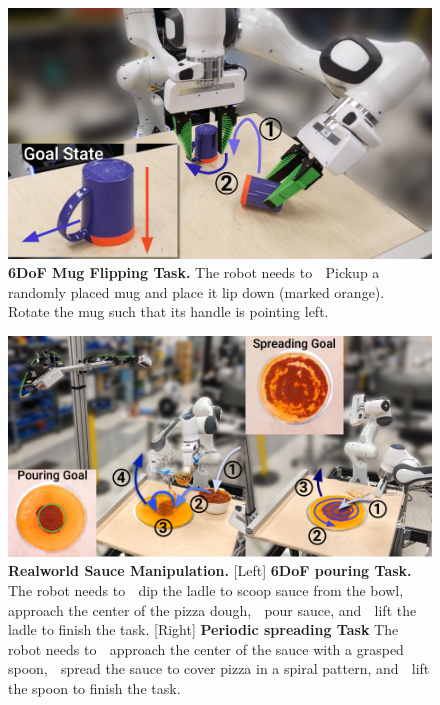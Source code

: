 \begin{figure}[t]
\centering
\includegraphics[width=0.9\linewidth]{figure/mug_task.pdf}

\vspace{1.5mm}

\caption{
\textbf{6DoF Mug Flipping Task.}
\label{fig:mug_task}
The robot needs to
\textcircled{} Pickup a randomly placed mug and place it lip down (marked orange).
\textcircled{} Rotate the mug such that its handle is pointing left.
}

\vspace{-4mm}
\end{figure}

\begin{figure}[t]
\centering
\includegraphics[width=\linewidth]{figure/real_sauce_setup.pdf}

\vspace{1.5mm}

\caption{\textbf{Realworld Sauce Manipulation. }
\label{fig:real_sauce_manipulation}
[Left] \textbf{6DoF pouring Task.} The robot needs to \textcircled{} dip the ladle to scoop sauce from the bowl, \textcircled{} approach the center of the pizza dough, \textcircled{} pour sauce, and \textcircled{} lift the ladle to finish the task.
[Right] \textbf{Periodic spreading Task} The robot needs to \textcircled{} approach the center of the sauce with a grasped spoon, \textcircled{} spread the sauce to cover pizza in a spiral pattern, and \textcircled{} lift the spoon to finish the task.
}

\vspace{-4mm}
\end{figure}

